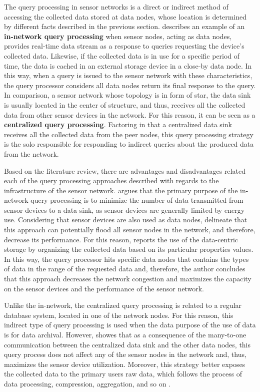 The query processing in sensor networks is a direct or indirect method of
accessing the collected data stored at data nodes, whose location is determined
by different facts described in the previous section. \cite{sn-storage03}
describes an example of an \textbf{in-network query processing} when sensor
nodes, acting as data nodes, provides real-time data stream as a response
to queries requesting the device's collected data. Likewise, if the collected
data is in use for a specific period of time, the data is cached in an external
storage device in a close-by data node. In this way, when a query is issued to
the sensor network with these characteristics, the query processor considers 
all data nodes return its final response to the query. In comparison, a sensor
network whose topology is in form of star, the data sink is usually located in
the center of structure, and thus, receives all the collected data from other
sensor devices in the network. For this reason, it can be seen as a 
\textbf{centralized query processing}. Factoring in that a centralized data
sink receives all the collected data from the peer nodes, this query processing
strategy is the solo responsible for responding to indirect queries about the
produced data from the network. 

Based on the literature review, there are advantages and disadvantages related
each of the query processing approaches described with regards to the
infrastructure of the sensor network. \cite{sn-storage03} argues that the 
primary purpose of the in-network query processing is to minimize the number
of data transmitted from sensor devices to a data sink, as sensor devices are
generally limited by energy use. Considering that sensor devices are also used
as data nodes, \cite{sn-storage04} delineate that this approach can potentially
flood all sensor nodes in the network, and therefore, decrease its performance.
For this reason, \cite{sn-storage01} reports the use of the data-centric
storage by organizing the collected data based on its particular properties
values. In this way, the query processor hits specific data nodes that contains
the types of data in the range of the requested data and, therefore, the author
concludes that this approach decreases the network congestion and maximizes the
capacity on the sensor devices and the performance of the sensor network.

Unlike the in-network, the centralized query processing is related to a regular
database system, located in one of the network nodes. For this reason, this
indirect type of query processing is used when the data purpose of the use of
data is for data archival. However, \cite{sn-storage02} showes that as a
consequence of the many-to-one communication between the centralized data sink
and the other data nodes, this query process does not affect any of the sensor
nodes in the network and, thus, maximizes the sensor device utilization. 
Moreover, this strategy better exposes the collected data to the primary users
raw data, which follows the process of data processing, compression,
aggregation, and so on \cite{sn-db-modeling02}.

